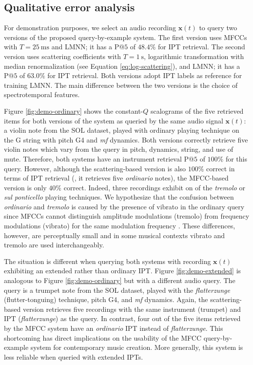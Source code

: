 \subsection{Qualitative error analysis}
For demonstration purposes, we select an audio recording $\boldsymbol{x}(t)$ to query two versions of the proposed query-by-example system.
The first version uses MFCCs with $T=\SI{25}{\milli\second}$ and LMNN; it has a P@$5$ of $48.4\%$ for IPT retrieval.
The second version uses scattering coefficients with $T=\SI{1}{\second}$, logarithmic transformation with median renormalization (see Equation \ref{eq:log-scattering}), and LMNN; it has a P@$5$ of $63.0\%$ for IPT retrieval.
Both versions adopt IPT labels as reference for training LMNN.
The main difference between the two versions is the choice of spectrotemporal features.

Figure \ref{fig:demo-ordinary} shows the constant-$Q$ scalograms of the five retrieved items for both versions of the system as queried by the same audio signal $\boldsymbol{x}(t)$: a violin note from the SOL dataset, played with ordinary playing technique on the G string with pitch G4 and \emph{mf} dynamics.
Both versions correctly retrieve five violin notes which vary from the query in pitch, dynamics, string, and use of mute.
Therefore, both systems have an instrument retrieval P@$5$ of $100\%$ for this query.
However, although the scattering-based version is also $100\%$ correct in terms of IPT retrieval (\ie{}, it retrieves five \emph{ordinario} notes), the MFCC-based version is only $40\%$ correct.
Indeed, three recordings exhibit on of the \emph{tremolo} or \emph{sul ponticello} playing techniques.
We hypothesize that the confusion between \emph{ordinario} and \emph{tremolo} is caused by the presence of vibrato in the ordinary query since MFCCs cannot distinguish amplitude modulations (tremolo) from frequency modulations (vibrato) for the same modulation frequency \cite{anden2012dafx}.
These differences, however, are perceptually small and in some musical contexts vibrato and tremolo are used interchangeably.

The situation is different when querying both systems with recording $\boldsymbol{x}(t)$ exhibiting an extended rather than ordinary IPT.
Figure \ref{fig:demo-extended} is analogous to Figure \ref{fig:demo-ordinary} but with a different audio query.
The query is a trumpet note from the SOL dataset, played with the \emph{flatterzunge} (flutter-tonguing) technique, pitch G4, and \emph{mf} dynamics.
Again, the scattering-based version retrieves five recordings with the same instrument (trumpet) and IPT (\emph{flatterzunge}) as the query.
In contrast, four out of the five items retrieved by the MFCC system have an \emph{ordinario} IPT instead of \emph{flatterzunge}.
This shortcoming has direct implications on the usability of the MFCC query-by-example system for contemporary music creation.
More generally, this system is less reliable when queried with extended IPTs.

